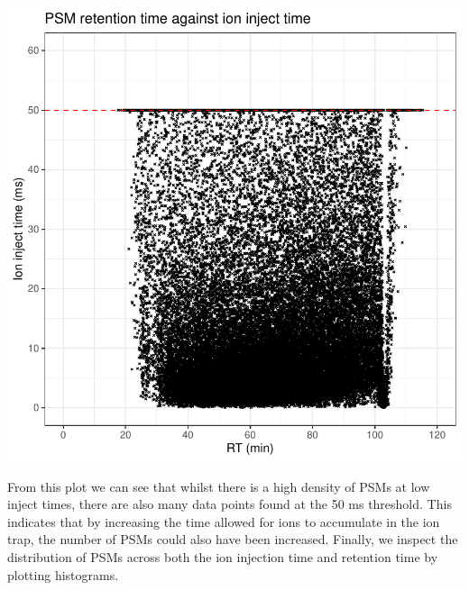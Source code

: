 \documentclass[9pt,a4paper,]{extarticle}
\begin{document}
\begin{center}\includegraphics[height=0.3\textheight]{workflow_expressions_files/figure-latex/tmt_ion_injection_1-1} \end{center}

From this plot we can see that whilst there is a high density of PSMs at low
inject times, there are also many data points found at the 50 ms threshold. This
indicates that by increasing the time allowed for ions to accumulate in the ion
trap, the number of PSMs could also have been increased. Finally, we inspect the
distribution of PSMs across both the ion injection time and retention time by
plotting histograms.
\end{document}
